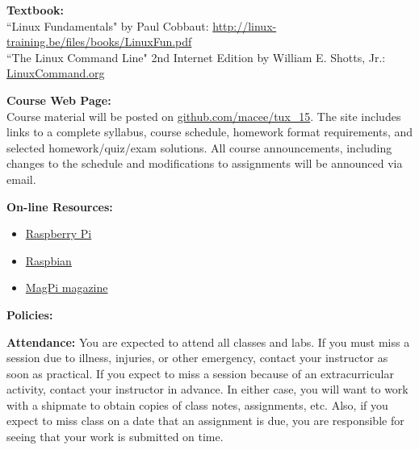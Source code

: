 \documentclass[12pt]{article}
\begin{document}
\vspace*{.15in}
\noindent\textbf{Textbook:}\\
``Linux Fundamentals" by Paul Cobbaut: \href{http://linux-training.be/files/books/LinuxFun.pdf}{http://linux-training.be/files/books/LinuxFun.pdf} \\
``The Linux Command Line" 2nd Internet Edition by William E. Shotts, Jr.: \href{LinuxCommand.org}{LinuxCommand.org}

\vspace*{.15in}


\vspace*{.15in}
\noindent\textbf{Course Web Page:}\\
Course material will be posted on \href{github.com/macee/tux\_15}{github.com/macee/tux\_15}. The site includes links to a complete syllabus, course schedule, homework format requirements, and selected homework/quiz/exam solutions.  All course announcements, including changes to the schedule and modifications to assignments will be announced via email.




\vspace*{.15in}
\noindent \textbf{On-line Resources:}
\begin{itemize}
    \item \href{https://www.raspberrypi.org/}{Raspberry Pi}
    \item \href{https://www.raspbian.org/}{Raspbian}
    \item \href{https://www.raspberrypi.org/magpi}{MagPi magazine}
\end{itemize}


\newpage







\vspace*{.15in}
\noindent\textbf{Policies:}

\vspace*{.15in}
\noindent\textbf{Attendance:} You are expected to attend all classes and labs. If you must miss a session due to illness, injuries, or other emergency, contact your instructor as soon as practical. If you expect to miss a session because of an extracurricular activity, contact your instructor in advance. In either case, you will want to work with a shipmate to obtain copies of class notes, assignments, etc. Also, if you expect to miss class on a date that an assignment is due, you are responsible for seeing that your work is submitted on time.
\end{document}

